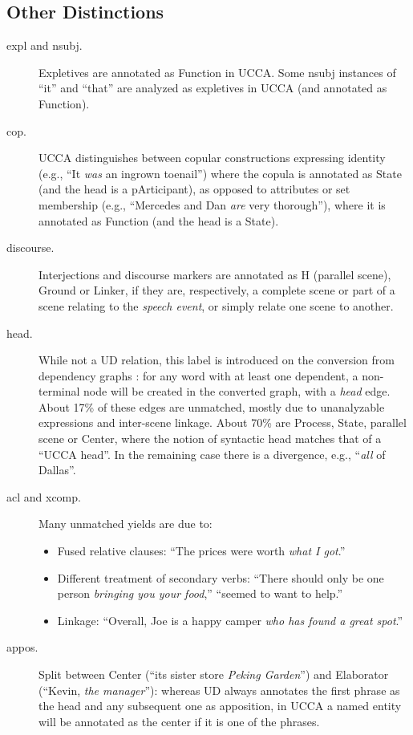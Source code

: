 \documentclass[11pt,a4paper]{article}
\begin{document}
\subsection{Other Distinctions}\label{sec:misc}

\begin{description}
	\item[expl and nsubj.]
	Expletives are annotated as Function in UCCA.
	Some nsubj instances of ``it'' and ``that''
	are analyzed as expletives in UCCA (and annotated as Function).
	
    \item[cop.]
	UCCA distinguishes between copular constructions expressing
	identity (e.g., ``It \textit{was} an ingrown toenail'') where the copula is annotated as State
	(and the head is a pArticipant),
	as opposed to attributes or set membership
	(e.g., ``Mercedes and Dan \textit{are} very thorough''), where it is annotated as Function
	(and the head is a State).
	
	\item[discourse.]
	Interjections and discourse markers are annotated as H (parallel scene), Ground or Linker,
	if they are, respectively, a complete scene or part of a scene relating to the \textit{speech event},
	or simply relate one scene to another.
	
	\item[head.]
	While not a UD relation, this label is introduced on the conversion from dependency graphs
	\cite{hershcovich2018multitask}: for any word with at least one dependent,
	a non-terminal node will be created in the converted graph, with a \textit{head} edge.
	About 17\% of these edges are unmatched, mostly due to unanalyzable expressions and inter-scene linkage.
	About 70\% are Process, State, parallel scene or Center,
	where the notion of syntactic head matches that of a ``UCCA head''.
	In the remaining case there is a divergence, e.g., ``\textit{all} of Dallas''.
	
	\item[acl and xcomp.]
	Many unmatched yields are due to:
	\begin{itemize}
	\item Fused relative clauses: ``The prices were worth \textit{what I got}.''
	\item Different treatment of secondary verbs: ``There should only be one person \textit{bringing you your food},''
	``seemed to want to help.''
	\item Linkage: ``Overall, Joe is a happy camper \textit{who has found a great spot}.''
	\end{itemize}
	
	\item[appos.]
	Split between Center (``its sister store \textit{Peking Garden}'')
	and Elaborator (``Kevin, \textit{the manager}''):
	whereas UD always annotates the first phrase as the head and any subsequent one as apposition,
	in UCCA a named entity will be annotated as the center if it is one of the phrases.
\end{description}
\end{document}
